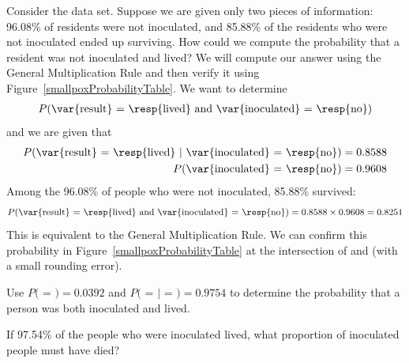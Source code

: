 \begin{examplewrap}
\begin{nexample}{Consider the  data set. Suppose we are given only two pieces of information: 96.08\% of residents were not inoculated, and 85.88\% of the residents who were not inoculated ended up surviving. How could we compute the probability that a resident was not inoculated and lived?}
We will compute our answer using the General Multiplication Rule and then verify it using Figure~\ref{smallpoxProbabilityTable}. We want to determine
\begin{align*}
P(\text{\var{result}
    = \resp{lived} and \var{inoculated} = \resp{no}})
\end{align*}
and we are given that
\begin{align*}
P(\text{\var{result}
    = \resp{lived} }|\text{ \var{inoculated} = \resp{no}})
    &= 0.8588 \\
P(\text{\var{inoculated} = \resp{no}})
    &= 0.9608
\end{align*}
Among the 96.08\% of people who were not inoculated, 85.88\% survived:
\begin{align*}
P(\text{\var{result} = \resp{lived}
        and \var{inoculated} = \resp{no}})
    = 0.8588 \times 0.9608
    = 0.8251
\end{align*}
This is equivalent to the General Multiplication Rule. We can confirm this probability in Figure~\ref{smallpoxProbabilityTable} at the intersection of  and  (with a small rounding error).
\end{nexample}
\end{examplewrap}

\begin{exercisewrap}
\begin{nexercise}
Use $P($ = $) = 0.0392$ and $P($ =  $|$  = $) = 0.9754$ to determine the probability that a person was both inoculated and lived.\footnotemark
\end{nexercise}
\end{exercisewrap}

\begin{exercisewrap}
\begin{nexercise}
If 97.54\% of the people who were inoculated lived, what proportion of inoculated people must have died?\footnotemark
\end{nexercise}
\end{exercisewrap}

